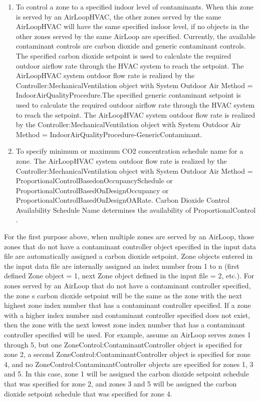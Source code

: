 \begin{enumerate}
\def\labelenumi{\arabic{enumi})}
\item
  To control a zone to a specified indoor level of contaminants. When this zone is served by an AirLoopHVAC, the other zones served by the same AirLoopHVAC will have the same specified indoor level, if no objects in the other zones served by the same AirLoop are specified. Currently, the available contaminant controls are carbon dioxide and generic contaminant controls. The specified carbon dioxide setpoint is used to calculate the required outdoor airflow rate through the HVAC system to reach the setpoint. The AirLoopHVAC system outdoor flow rate is realized by the Controller:MechanicalVentilation object with System Outdoor Air Method = IndoorAirQualityProcedure.The specified generic contaminant setpoint is used to calculate the required outdoor airflow rate through the HVAC system to reach the setpoint. The AirLoopHVAC system outdoor flow rate is realized by the Controller:MechanicalVentilation object with System Outdoor Air Method = IndoorAirQualityProcedure-GenericContaminant.
\item
  To specify minimum or maximum CO2 concentration schedule name for a zone. The AirLoopHVAC system outdoor flow rate is realized by the Controller:MechanicalVentilation object with System Outdoor Air Method = ProportionalControlBasedonOccupancySchedule or ProportionalControlBasedOnDesignOccupancy or ProportionalControlBasedOnDesignOARate. Carbon Dioxide Control Availability Schedule Name determines the availability of ProportionalControl .
\end{enumerate}

For the first purpose above, when multiple zones are served by an AirLoop, those zones that do not have a contaminant controller object specified in the input data file are automatically assigned a carbon dioxide setpoint. Zone objects entered in the input data file are internally assigned an index number from 1 to n (first defined Zone object = 1, next Zone object defined in the input file = 2, etc.). For zones served by an AirLoop that do not have a contaminant controller specified, the zone s carbon dioxide setpoint will be the same as the zone with the next highest zone index number that has a contaminant controller specified. If a zone with a higher index number and contaminant controller specified does not exist, then the zone with the next lowest zone index number that has a contaminant controller specified will be used. For example, assume an AirLoop serves zones 1 through 5, but one ZoneControl:ContaminantController object is specified for zone 2, a second ZoneControl:ContaminantController object is specified for zone 4, and no ZoneControl:ContaminantController objects are specified for zones 1, 3 and 5. In this case, zone 1 will be assigned the carbon dioxide setpoint schedule that was specified for zone 2, and zones 3 and 5 will be assigned the carbon dioxide setpoint schedule that was specified for zone 4.

